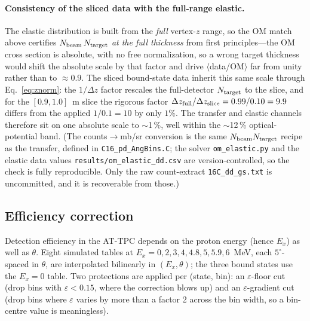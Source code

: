 \documentclass[11pt,a4paper]{article}
\begin{document}
\paragraph{Consistency of the sliced data with the full-range elastic.}
The elastic distribution is built from the \emph{full} vertex-$z$ range, so the
OM match above certifies $N_{\rm beam}\,N_{\rm target}$ \emph{at the full
thickness} from first principles---the OM cross section is absolute, with no
free normalization, so a wrong target thickness would shift the absolute scale
by that factor and drive $\langle$data/OM$\rangle$ far from unity rather than to
$\approx0.9$. The sliced bound-state data inherit this same scale through
Eq.~\eqref{eq:znorm}: the $1/\Delta z$ factor rescales the full-detector
$N_{\rm target}$ to the slice, and for the $[0.9,1.0]$~m slice the rigorous
factor $\Delta z_{\rm full}/\Delta z_{\rm slice}=0.99/0.10=9.9$ differs from the
applied $1/0.1=10$ by only $1\%$. The transfer and elastic channels therefore
sit on one absolute scale to $\sim$1\,\%, well within the $\sim$12\,\%
optical-potential band. (The counts$\to$mb/sr conversion is the same
$N_{\rm beam}N_{\rm target}$ recipe as the transfer, defined in
\texttt{C16\_pd\_AngBins.C}; the solver \texttt{om\_elastic.py} and the elastic
data values \texttt{results/om\_elastic\_dd.csv} are version-controlled, so the
check is fully reproducible. Only the raw count-extract \texttt{16C\_dd\_gs.txt}
is uncommitted, and it is recoverable from those.)

\subsection{Efficiency correction}
\label{sec:eff}
Detection efficiency in the AT-TPC depends on the proton energy (hence $E_x$)
as well as $\theta$. Eight simulated tables at $E_x=0,2,3,4,4.8,5,5.9,6$~MeV,
each $5^\circ$-spaced in $\theta$, are interpolated bilinearly in
$(E_x,\theta)$; the three bound states use the $E_x=0$ table. Two protections
are applied per (state, bin): an $\varepsilon$-floor cut (drop bins with
$\varepsilon<0.15$, where the correction blows up) and an $\varepsilon$-gradient
cut (drop bins where $\varepsilon$ varies by more than a factor 2 across the bin
width, so a bin-centre value is meaningless).
\end{document}
